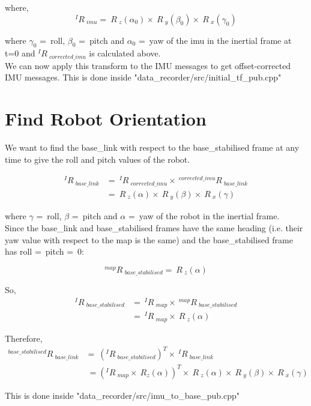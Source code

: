 \documentclass{article}
\begin{document}
where,
\begin{equation}
^{I}R\ _{imu} =\ R\ _z(\alpha_0) \times\  R\ _y(\beta_0) \times\  R\ _x(\gamma_0) 
\end{equation}

where $\gamma_0$ =\ roll, $\beta_0$ =\ pitch and $\alpha_0$ =\ yaw of the imu in the inertial frame at t=0 and $^{I}R\ _{corrected\_imu} $ is calculated above.\\

We can now apply this transform to the IMU messages to get offset-corrected IMU messages. This is done inside "data\_recorder/src/initial\_tf\_pub.cpp"

\section{Find Robot Orientation}
We want to find the base\_link with respect to the base\_stabilised frame at any time to give the roll and pitch values of the robot.

\begin{align}
^{I}R\ _{base\_link} & =\ ^{I}R\ _{corrected\_imu} \times\  ^{corrected\_imu}R\ _{base\_link}\\
 & =\ R\ _z(\alpha) \times\  R\ _y(\beta) \times\  R\ _x(\gamma) 
\end{align}

where $\gamma$ =\ roll, $\beta$ =\ pitch and $\alpha$ =\ yaw of the robot in the inertial frame.\\

Since the base\_link and base\_stabilised frames have the same heading (i.e. their yaw value with respect to the map is the same) and the base\_stabilised frame has roll =\ pitch =\ 0:

\begin{equation}
^{map}R\ _{base\_stabilised} =\ R\ _z(\alpha) 
\end{equation}

So,
\begin{align}
^{I}R\ _{base\_stabilised} & =\ ^{I}R\ _{map} \times\  ^{map}R\ _{base\_stabilised}\\
 & =\ ^{I}R\ _{map} \times\  R\ _z(\alpha) 
\end{align}

Therefore,
\begin{align}
^{base\_stabilised}R\ _{base\_link} &=\ (^{I}R\ _{base\_stabilised})^T \times\  ^{I}R\ _{base\_link}\\
 &\ = (^{I}R\ _{map} \times\  R_z(\alpha))^T \times\  R\ _z(\alpha) \times\  R\ _y(\beta) \times\  R\ _x(\gamma) 
\end{align}

This is done inside "data\_recorder/src/imu\_to\_base\_pub.cpp"
\end{document}

